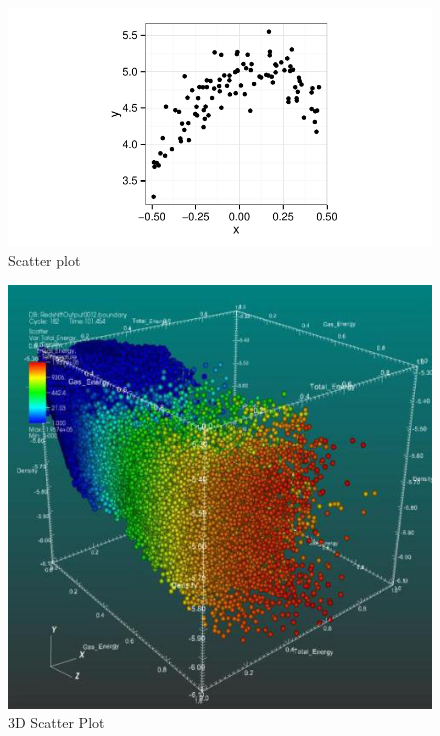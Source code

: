 \begin{figure}[ht]
      \includegraphics[width=\columnwidth]{images/Scatterplot5.pdf}
      \caption{Scatter plot \cite{Viz}}
      \label{scatter}
      \end{figure}

\begin{figure}[ht]
      \includegraphics[width=\columnwidth]{images/Scatter_plot.jpg}
      \caption{3D Scatter Plot \cite{Viz}}
      \label{scatter3D}
\end{figure}

